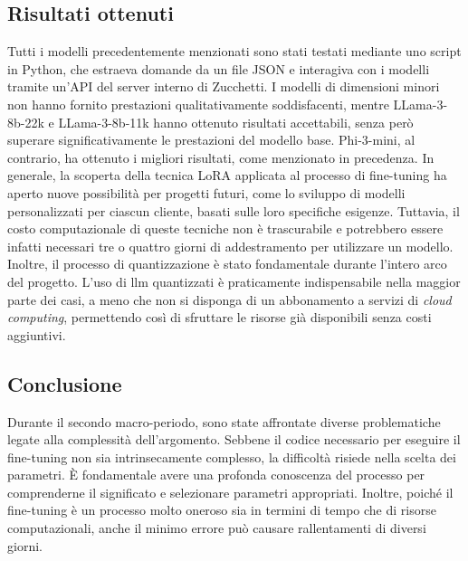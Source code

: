     \subsection{Risultati ottenuti}
    Tutti i modelli precedentemente menzionati sono stati testati mediante uno script in Python, che estraeva domande da un file JSON e interagiva con i modelli tramite un'API del server interno di Zucchetti. I modelli di dimensioni minori non hanno fornito prestazioni qualitativamente soddisfacenti, mentre LLama-3-8b-22k e LLama-3-8b-11k hanno ottenuto risultati accettabili, senza però superare significativamente le prestazioni del modello base. Phi-3-mini, al contrario, ha ottenuto i migliori risultati, come menzionato in precedenza.
    In generale, la scoperta della tecnica LoRA applicata al processo di fine-tuning ha aperto nuove possibilità per progetti futuri, come lo sviluppo di modelli personalizzati per ciascun cliente, basati sulle loro specifiche esigenze. Tuttavia, il costo computazionale di queste tecniche non è trascurabile e potrebbero essere infatti necessari tre o quattro giorni di addestramento per utilizzare un modello.
    Inoltre, il processo di quantizzazione è stato fondamentale durante l'intero arco del progetto. L'uso di \gls{llm} quantizzati è praticamente indispensabile nella maggior parte dei casi, a meno che non si disponga di un abbonamento a servizi di \textit{cloud computing}, permettendo così di sfruttare le risorse già disponibili senza costi aggiuntivi.

    \subsection{Conclusione}
    Durante il secondo macro-periodo, sono state affrontate diverse problematiche legate alla complessità dell'argomento. Sebbene il codice necessario per eseguire il \gls{fine-tuning} non sia intrinsecamente complesso, la difficoltà risiede nella scelta dei parametri. È fondamentale avere una profonda conoscenza del processo per comprenderne il significato e selezionare parametri appropriati. Inoltre, poiché il \gls{fine-tuning} è un processo molto oneroso sia in termini di tempo che di risorse computazionali, anche il minimo errore può causare rallentamenti di diversi giorni.
    
    

\newpage